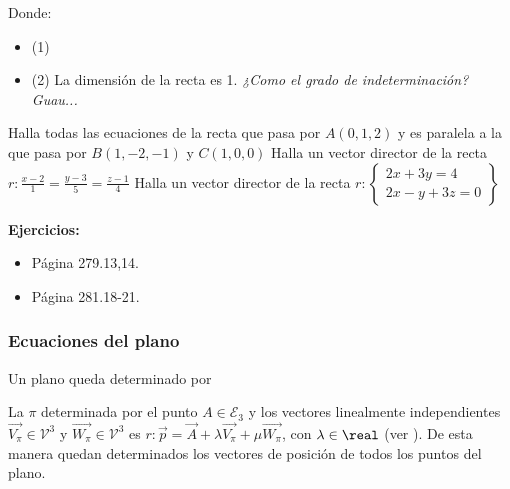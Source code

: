 Donde:
\begin{itemize}
    \item (1) 
    \item (2) 
    \subitem \obs {}
    \subitem \obs La dimensión de la recta es 1. \emph{¿Como el grado de indeterminación? Guau...}
\end{itemize}

\begin{problem}
    \ppart 
    Halla todas las ecuaciones de la recta que pasa por $A(0,1,2)$ y es paralela a la que pasa por $B(1,-2,-1)$ y $C(1,0,0)$
    \ppart 
    Halla un vector director de la recta $r:\displaystyle\frac{x-2}{1} = \frac{y-3}{5} = \frac{z-1}{4}$
    \ppart 
    Halla un vector director de la recta $r:\displaystyle\left\{\begin{array}{c} 2x+3y=4\\2x-y+3z=0\end{array}\right\}$
    \solution

\end{problem}

\textbf{Ejercicios:} 
\begin{itemize}
  \item Página 279.13,14.
  \item Página 281.18-21.
\end{itemize}

\subsubsection{Ecuaciones del plano}

Un plano queda determinado por 

La 
%
%
$\pi$ determinada por el punto $A\in\mathcal{E}_3$ y los vectores linealmente independientes $\vec{V_{\pi}}\in\mathcal{V}^3$ y $\vec{W_{\pi}}\in\mathcal{V}^3$  es $r : \vec{p} = \vec{A} + \lambda \vec{V_{\pi}} + \mu\vec{W_{\pi}}$, con $\lambda\in\real$ (ver ). De esta manera quedan determinados los vectores de posición de todos los puntos del plano.

